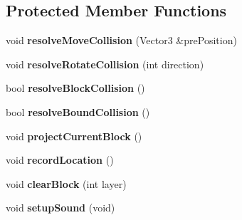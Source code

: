 \subsection*{Protected Member Functions}
\begin{DoxyCompactItemize}
\item 
\hypertarget{class_block_manager_a2b2c737776e012b5b6c2830e1d3c4da7}{void {\bfseries resolve\-Move\-Collision} (Vector3 \&pre\-Position)}\label{class_block_manager_a2b2c737776e012b5b6c2830e1d3c4da7}

\item 
\hypertarget{class_block_manager_a599c67ecfbac762fef8936e8ba47f89c}{void {\bfseries resolve\-Rotate\-Collision} (int direction)}\label{class_block_manager_a599c67ecfbac762fef8936e8ba47f89c}

\item 
\hypertarget{class_block_manager_a28c627de985af22a9efc893431954385}{bool {\bfseries resolve\-Block\-Collision} ()}\label{class_block_manager_a28c627de985af22a9efc893431954385}

\item 
\hypertarget{class_block_manager_af419044ea5a2146626b8af9beb14bba1}{bool {\bfseries resolve\-Bound\-Collision} ()}\label{class_block_manager_af419044ea5a2146626b8af9beb14bba1}

\item 
\hypertarget{class_block_manager_ae2c5327d3e1c9a6d9aaf58fb082fb9da}{void {\bfseries project\-Current\-Block} ()}\label{class_block_manager_ae2c5327d3e1c9a6d9aaf58fb082fb9da}

\item 
\hypertarget{class_block_manager_a53c2746558ef05c9eb2bfc26d5836170}{void {\bfseries record\-Location} ()}\label{class_block_manager_a53c2746558ef05c9eb2bfc26d5836170}

\item 
\hypertarget{class_block_manager_a7f8ede085348bd637eeabfb208487d0f}{void {\bfseries clear\-Block} (int layer)}\label{class_block_manager_a7f8ede085348bd637eeabfb208487d0f}

\item 
\hypertarget{class_block_manager_a6e4ef5a21263539dfd1eacf253fbaca2}{void {\bfseries setup\-Sound} (void)}\label{class_block_manager_a6e4ef5a21263539dfd1eacf253fbaca2}

\end{DoxyCompactItemize}

